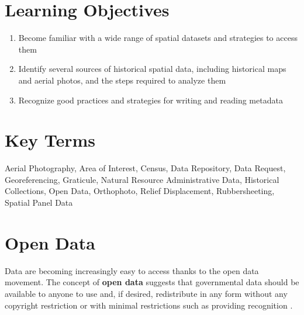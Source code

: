 \documentclass[
]{book}
\providecommand{\tightlist}{%
  \setlength{\itemsep}{0pt}\setlength{\parskip}{0pt}}
\begin{document}
\section*{Learning Objectives}\label{learning-objectives-3}

\begin{enumerate}
\def\labelenumi{\arabic{enumi}.}
\tightlist
\item
  Become familiar with a wide range of spatial datasets and strategies to access them
\item
  Identify several sources of historical spatial data, including historical maps and aerial photos, and the steps required to analyze them
\item
  Recognize good practices and strategies for writing and reading metadata
\end{enumerate}

\section*{Key Terms}\label{key-terms-3}

Aerial Photography, Area of Interest, Census, Data Repository, Data Request, Georeferencing, Graticule, Natural Resource Administrative Data, Historical Collections, Open Data, Orthophoto, Relief Displacement, Rubbersheeting, Spatial Panel Data

\section{Open Data}\label{open-data}

Data are becoming increasingly easy to access thanks to the open data movement. The concept of \textbf{open data} suggests that governmental data should be available to anyone to use and, if desired, redistribute in any form without any copyright restriction or with minimal restrictions such as providing recognition \citep{kassen_promising_2013}.
\end{document}
